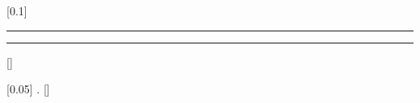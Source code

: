 \newcommand{\docenvdef}[1]{\hlred{\texttt{#1}}\label{env:#1}\index{#1 environment@\texttt{#1} environment}\index{environments!#1@\texttt{#1}}}%
\newcommand{\docpkg}[1]{\texttt{#1}\index{#1 package@\texttt{#1} package}\index{packages!#1@\texttt{#1}}}%
\newcommand{\doccls}[1]{\texttt{#1}}%
\newcommand{\docclsopt}[1]{\texttt{#1}\index{#1 class option@\texttt{#1} class option}\index{class options!#1@\texttt{#1}}}%
\newcommand{\docclsoptdef}[1]{\hlred{\texttt{#1}}\label{clsopt:#1}\index{#1 class option@\texttt{#1} class option}\index{class options!#1@\texttt{#1}}}%
\newcommand{\docmsg}[2]{\bigskip\begin{fullwidth}\noindent\ttfamily#1\end{fullwidth}\medskip\par\noindent#2}
\newcommand{\docfilehook}[2]{\texttt{#1}\index{file hooks!#2}\index{#1@\texttt{#1}}}
\newcommand{\doccounter}[1]{\texttt{#1}\index{#1 counter@\texttt{#1} counter}}

\usepackage{makeidx}
\makeindex


\setcounter{secnumdepth}{1} %
\setcounter{tocdepth}{2}    %

%
    [0.1\textwidth]%
    {\centering {} \rule{0.9\textwidth}{1pt}\newline}%
    { }%
    {  }%
    {\newline\rule{0.9\textwidth}{1pt}}%
    [\vspace*{0.1\baselineskip}]%

%
    [0.05\textwidth]%
    {\bfseries}%
    {\thecontentslabel.\hspace{5pt}}%
    {\hspace{0em}}%
    {\qquad\hfill \thecontentspage}%
    [\vspace*{0.0\baselineskip}]%

